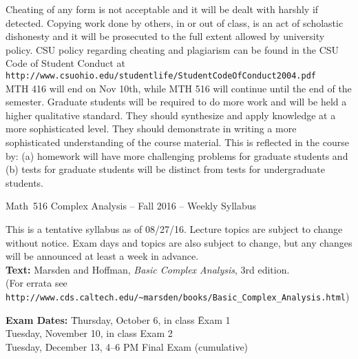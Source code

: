 \documentclass[11pt]{article}
\begin{document}
 Cheating of any form is not
acceptable and it will be dealt with harshly if detected. 
Copying work done by others, in or out of class, is an act of
scholastic dishonesty and it will be prosecuted to the full extent
allowed by university policy. 
CSU policy regarding cheating and plagiarism can be found in the CSU
Code of Student Conduct at
{\tt http://www.csuohio.edu/studentlife/StudentCodeOfConduct2004.pdf}\\

MTH 416 will end on Nov 10th, while MTH 516 will continue until the end of the semester.
Graduate students will be required to do more work and will be held a higher
qualitative standard.  They should synthesize and apply knowledge at a
more sophisticated level.  They should
demonstrate in writing a more sophisticated understanding of the
course material.
This is reflected in the course by: (a) homework will have more challenging problems for
graduate students and (b) tests for graduate students will be distinct from tests for
undergraduate students.

\newpage
\setlength{\topmargin}{0in}
\setlength{\oddsidemargin}{0in}
\setlength{\textwidth}{6.5in}
\setlength{\textheight}{9.2in}
\setlength{\parindent}{0in}
\pagestyle{empty}

\begin{center}
\begin{bf}
\noindent
{\large Math~516 Complex Analysis -- Fall 2016 -- Weekly Syllabus}\\
\end{bf}
\end{center}

This is a tentative syllabus as of 08/27/16. Lecture topics are subject
to change without notice. Exam days and topics 
are also subject to change, but any changes will be
announced at least a week in advance.\\
  
{\bf Text:} Marsden and Hoffman, {\it
  Basic Complex Analysis}, 3rd edition.\\
(For errata see \verb|http://www.cds.caltech.edu/~marsden/books/Basic_Complex_Analysis.html|) 
 
\begin{tabbing}
{\bf Exam Dates: }
\= Thursday, October 6, in class \hspace{1in} \= Exam 1\\ 
\> Tuesday, November 10, in class  \> Exam 2\\
\> Tuesday, December 13, 4--6 PM \> Final Exam (cumulative)\\
\end{tabbing}
\end{document}
